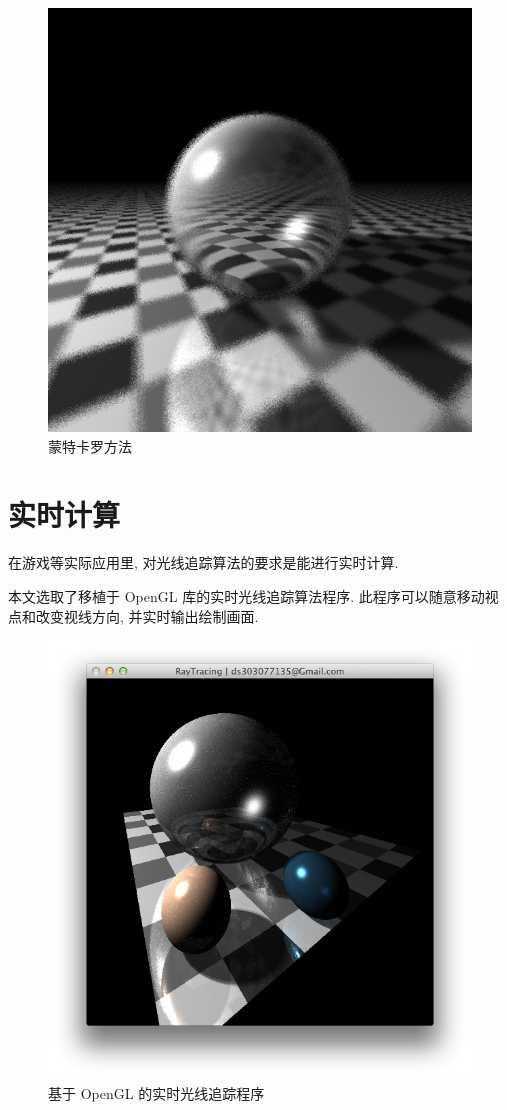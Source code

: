 \documentclass[10pt,twocolumn]{article}
\begin{document}
\begin{figure}[ht]
\centering
\includegraphics[scale=.4]{fig13.jpg}
\caption{蒙特卡罗方法}
\end{figure}

\section{\hei 实时计算}
在游戏等实际应用里, 对光线追踪算法的要求是能进行实时计算.

本文选取了移植于 OpenGL 库的实时光线追踪算法程序. 此程序可以随意移动视点和改变视线方向, 并实时输出绘制画面.

\begin{figure}[ht]
\centering
\includegraphics[scale=.35]{fig14.png}
\caption{基于 OpenGL 的实时光线追踪程序}
\end{figure}
\end{document}
